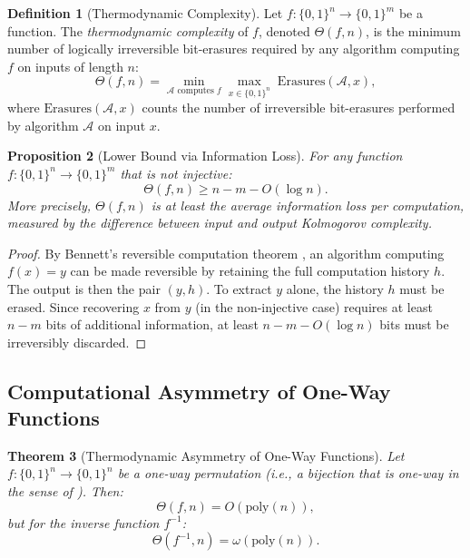 \documentclass[12pt, a4paper]{article}
\newcommand{\poly}{\text{poly}}
\theoremstyle{plain}
\newtheorem{theorem}{Theorem}[section]
\newtheorem{proposition}[theorem]{Proposition}
\theoremstyle{definition}
\newtheorem{definition}[theorem]{Definition}
\theoremstyle{remark}
\begin{document}
\begin{definition}[Thermodynamic Complexity]\label{def:theta}
  Let $f: \{0,1\}^n \to \{0,1\}^m$ be a function. The \emph{thermodynamic
  complexity} of $f$, denoted $\Theta(f, n)$, is the minimum number of
  logically irreversible bit-erasures required by any algorithm computing
  $f$ on inputs of length $n$:
  \begin{equation}\label{eq:theta}
    \Theta(f, n) = \min_{\mathcal{A} \text{ computes } f}
    \max_{x \in \{0,1\}^n} \; \text{Erasures}(\mathcal{A}, x),
  \end{equation}
  where $\text{Erasures}(\mathcal{A}, x)$ counts the number of
  irreversible bit-erasures performed by algorithm $\mathcal{A}$ on
  input $x$.
\end{definition}

\begin{proposition}[Lower Bound via Information Loss]\label{prop:info_loss}
  For any function $f: \{0,1\}^n \to \{0,1\}^m$ that is not injective:
  \begin{equation}\label{eq:info_loss}
    \Theta(f, n) \geq n - m - O(\log n).
  \end{equation}
  More precisely, $\Theta(f, n)$ is at least the average information
  loss per computation, measured by the difference between input and
  output Kolmogorov complexity.
\end{proposition}

\begin{proof}
  By Bennett's reversible computation theorem \citep{Bennett1973}, an
  algorithm computing $f(x) = y$ can be made reversible by retaining
  the full computation history $h$. The output is then the pair $(y, h)$.
  To extract $y$ alone, the history $h$ must be erased. Since recovering
  $x$ from $y$ (in the non-injective case) requires at least $n - m$
  bits of additional information, at least $n - m - O(\log n)$ bits must
  be irreversibly discarded.
\end{proof}

\subsection{Computational Asymmetry of One-Way Functions}

\begin{theorem}[Thermodynamic Asymmetry of One-Way Functions]\label{thm:asymmetry}
  Let $f: \{0,1\}^n \to \{0,1\}^n$ be a one-way permutation (i.e., a
  bijection that is one-way in the sense of ). Then:
  \begin{equation}\label{eq:asymmetry}
    \Theta(f, n) = O(\poly(n)),
  \end{equation}
  but for the inverse function $f^{-1}$:
  \begin{equation}\label{eq:inverse_cost}
    \Theta(f^{-1}, n) = \omega(\poly(n)).
  \end{equation}
\end{theorem}
\end{document}
